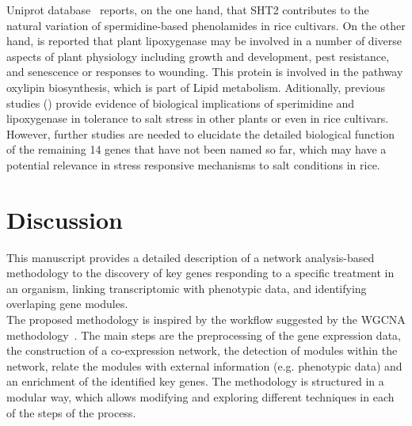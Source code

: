\documentclass[12pt,journal, onecolumn]{IEEEtran}
\begin{document}
Uniprot database~\cite{uniprot2018uniprot} reports, on the one hand, that SHT2 contributes to the natural variation of spermidine-based phenolamides in rice cultivars. On the other hand, is reported that plant lipoxygenase may be involved in a number of diverse aspects of plant physiology including growth and development, pest resistance, and senescence or responses to wounding. This protein is involved in the pathway oxylipin biosynthesis, which is part of Lipid metabolism. Aditionally, previous studies (\cite{gupta2013plant, hou2015persimmon, mittova2002salt, peng2019novel, roychoudhury2011amelioration}) provide evidence of biological implications of sperimidine and lipoxygenase in tolerance to salt stress in other plants or even in rice cultivars. However, further studies are needed to elucidate the detailed biological function of the remaining 14 genes that have not been named so far,  which may have a potential relevance in stress responsive mechanisms to salt conditions in rice.






\section{Discussion}

This manuscript provides a detailed description of a network analysis-based methodology to 
the discovery of key genes responding to a specific treatment in an organism, linking transcriptomic with phenotypic data, and identifying overlaping gene modules.\\

The proposed methodology is inspired by the workflow suggested by the WGCNA methodology~\cite{langfelder2008wgcna}. The main steps are the preprocessing of the gene expression data, the construction of a co-expression network, the detection of modules within the network, relate the modules with external information (e.g. phenotypic data) and an enrichment of the identified key genes. The methodology is structured in a modular way, which allows modifying and exploring different techniques in each of the steps of the process. \\

\end{document}
